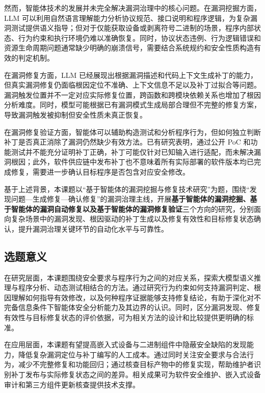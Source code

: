 然而，智能体技术的发展并未完全解决漏洞治理中的核心问题。在漏洞挖掘方面，LLM 可以利用自然语言理解能力分析协议规范、接口说明和程序逻辑，为复杂漏洞测试提供语义指导；但对于仅能获取设备或剥离符号二进制的场景，程序内部状态、行为约束和执行环境仍难以准确恢复\cite{binrex,fuzzware}。同时，协议状态违例、行为逻辑错误和资源生命周期问题通常缺少明确的崩溃信号，需要结合系统规约和安全性质构造有效的判定机制\cite{oracleproblem}。

在漏洞修复方面，LLM 已经展现出根据漏洞描述和代码上下文生成补丁的能力，但真实漏洞修复仍面临根因定位不准确、上下文信息不足以及补丁过拟合等问题。漏洞触发位置并不一定对应实际修复位置，跨函数和跨模块依赖关系也增加了根因分析难度\cite{li2024interpvd}。同时，模型可能根据已有漏洞模式生成局部合理但不完整的修复方案，导致漏洞触发被抑制但安全性质未真正恢复\cite{nong2025appatch}。

在漏洞修复验证方面，智能体可以辅助构造测试和分析程序行为，但如何独立判断补丁是否真正消除了漏洞仍然缺少有效方法。已有研究表明，通过公开 PoC 和功能测试并不能充分证明补丁正确，补丁可能仅针对已知输入进行适配，而未解决漏洞根因\cite{smith2015cure}；此外，软件供应链中发布补丁也不意味着所有实际部署的软件版本均已完成修复，需要进一步确认目标程序是否包含对应安全修改\cite{fiber}。

基于上述背景，本课题以“基于智能体的漏洞挖掘与修复技术研究”为题，围绕“发现问题—生成修复—确认修复”的漏洞治理主线，开展\textbf{基于智能体的漏洞挖掘、基于智能体的漏洞自动修复以及基于智能体的漏洞修复验证}三个方向的研究，分别面向复杂场景中的漏洞发现、根因驱动的补丁生成以及修复有效性和目标修复状态确认，提升漏洞治理关键环节的自动化水平与可靠性。
\subsection{选题意义}
\label{sec:research-significance}

在研究层面，本课题围绕安全要求与程序行为之间的对应关系，探索大模型语义推理与程序分析、动态测试相结合的方法。通过研究行为约束如何支持漏洞判定、根因理解如何指导有效修改，以及何种程序证据能够支持修复结论，有助于深化对不完备信息条件下智能体安全分析能力及其边界的认识。同时，区分漏洞发现、修复有效性与目标修复状态的评价依据，可为相关方法的设计和比较提供更明确的标准。

在应用层面，本课题有望提高嵌入式设备与二进制组件中隐蔽安全缺陷的发现能力，降低复杂漏洞定位与补丁编写的人工成本。通过同时关注安全要求与合法行为，减少不完整修复和功能回归；通过核查目标产物中的修复实现，帮助维护者识别补丁发布与实际修复状态之间的差异。相关成果可为软件安全维护、嵌入式设备审计和第三方组件更新核查提供技术支撑。

